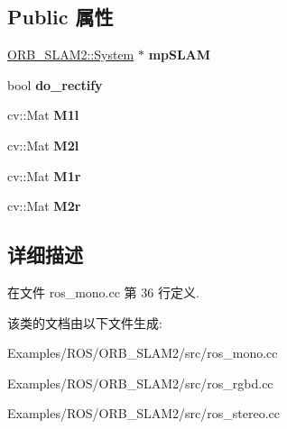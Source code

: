 \subsection*{Public 属性}
\begin{DoxyCompactItemize}
\item 
\hypertarget{classImageGrabber_a09543ab679feffd1969ad9bca851652f}{\hyperlink{classORB__SLAM2_1_1System}{O\-R\-B\-\_\-\-S\-L\-A\-M2\-::\-System} $\ast$ {\bfseries mp\-S\-L\-A\-M}}\label{classImageGrabber_a09543ab679feffd1969ad9bca851652f}

\item 
\hypertarget{classImageGrabber_a773e5d7e773fd5e2cf695e9b7de418b0}{bool {\bfseries do\-\_\-rectify}}\label{classImageGrabber_a773e5d7e773fd5e2cf695e9b7de418b0}

\item 
\hypertarget{classImageGrabber_a6074a577631bc9ca7cb1e9a53d384175}{cv\-::\-Mat {\bfseries M1l}}\label{classImageGrabber_a6074a577631bc9ca7cb1e9a53d384175}

\item 
\hypertarget{classImageGrabber_ac85158e1dfb61d91c16271649d9a0354}{cv\-::\-Mat {\bfseries M2l}}\label{classImageGrabber_ac85158e1dfb61d91c16271649d9a0354}

\item 
\hypertarget{classImageGrabber_a1b32be412baa2e1a606863375ba8ff83}{cv\-::\-Mat {\bfseries M1r}}\label{classImageGrabber_a1b32be412baa2e1a606863375ba8ff83}

\item 
\hypertarget{classImageGrabber_aaf139de883a63055e03d4c82e953bb88}{cv\-::\-Mat {\bfseries M2r}}\label{classImageGrabber_aaf139de883a63055e03d4c82e953bb88}

\end{DoxyCompactItemize}


\subsection{详细描述}


在文件 ros\-\_\-mono.\-cc 第 36 行定义.



该类的文档由以下文件生成\-:\begin{DoxyCompactItemize}
\item 
Examples/\-R\-O\-S/\-O\-R\-B\-\_\-\-S\-L\-A\-M2/src/ros\-\_\-mono.\-cc\item 
Examples/\-R\-O\-S/\-O\-R\-B\-\_\-\-S\-L\-A\-M2/src/ros\-\_\-rgbd.\-cc\item 
Examples/\-R\-O\-S/\-O\-R\-B\-\_\-\-S\-L\-A\-M2/src/ros\-\_\-stereo.\-cc\end{DoxyCompactItemize}
